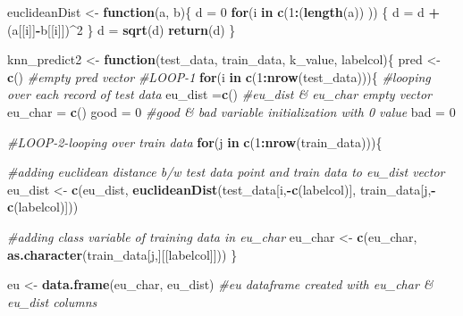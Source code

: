 \documentclass[]{article}
\newenvironment{Shaded}{\begin{snugshade}}{\end{snugshade}}
\newcommand{\KeywordTok}[1]{\textcolor[rgb]{0.13,0.29,0.53}{\textbf{#1}}}
\newcommand{\DecValTok}[1]{\textcolor[rgb]{0.00,0.00,0.81}{#1}}
\newcommand{\StringTok}[1]{\textcolor[rgb]{0.31,0.60,0.02}{#1}}
\newcommand{\CommentTok}[1]{\textcolor[rgb]{0.56,0.35,0.01}{\textit{#1}}}
\newcommand{\ControlFlowTok}[1]{\textcolor[rgb]{0.13,0.29,0.53}{\textbf{#1}}}
\newcommand{\OperatorTok}[1]{\textcolor[rgb]{0.81,0.36,0.00}{\textbf{#1}}}
\newcommand{\NormalTok}[1]{#1}
\begin{document}
\begin{Shaded}
\begin{Highlighting}[]
\NormalTok{euclideanDist <-}\StringTok{ }\ControlFlowTok{function}\NormalTok{(a, b)\{}
\NormalTok{  d =}\StringTok{ }\DecValTok{0}
  \ControlFlowTok{for}\NormalTok{(i }\ControlFlowTok{in} \KeywordTok{c}\NormalTok{(}\DecValTok{1}\OperatorTok{:}\NormalTok{(}\KeywordTok{length}\NormalTok{(a)) ))}
\NormalTok{  \{}
\NormalTok{    d =}\StringTok{ }\NormalTok{d }\OperatorTok{+}\StringTok{ }\NormalTok{(a[[i]]}\OperatorTok{-}\NormalTok{b[[i]])}\OperatorTok{^}\DecValTok{2}
\NormalTok{  \}}
\NormalTok{  d =}\StringTok{ }\KeywordTok{sqrt}\NormalTok{(d)}
  \KeywordTok{return}\NormalTok{(d)}
\NormalTok{\}}

\NormalTok{knn_predict2 <-}\StringTok{ }\ControlFlowTok{function}\NormalTok{(test_data, train_data, k_value, labelcol)\{}
\NormalTok{  pred <-}\StringTok{ }\KeywordTok{c}\NormalTok{()  }\CommentTok{#empty pred vector }
  \CommentTok{#LOOP-1}
  \ControlFlowTok{for}\NormalTok{(i }\ControlFlowTok{in} \KeywordTok{c}\NormalTok{(}\DecValTok{1}\OperatorTok{:}\KeywordTok{nrow}\NormalTok{(test_data)))\{   }\CommentTok{#looping over each record of test data}
\NormalTok{    eu_dist =}\KeywordTok{c}\NormalTok{()          }\CommentTok{#eu_dist & eu_char empty  vector}
\NormalTok{    eu_char =}\StringTok{ }\KeywordTok{c}\NormalTok{()}
\NormalTok{    good =}\StringTok{ }\DecValTok{0}              \CommentTok{#good & bad variable initialization with 0 value}
\NormalTok{    bad =}\StringTok{ }\DecValTok{0}
    
    \CommentTok{#LOOP-2-looping over train data }
    \ControlFlowTok{for}\NormalTok{(j }\ControlFlowTok{in} \KeywordTok{c}\NormalTok{(}\DecValTok{1}\OperatorTok{:}\KeywordTok{nrow}\NormalTok{(train_data)))\{}
 
      \CommentTok{#adding euclidean distance b/w test data point and train data to eu_dist vector}
\NormalTok{      eu_dist <-}\StringTok{ }\KeywordTok{c}\NormalTok{(eu_dist, }\KeywordTok{euclideanDist}\NormalTok{(test_data[i,}\OperatorTok{-}\KeywordTok{c}\NormalTok{(labelcol)], train_data[j,}\OperatorTok{-}\KeywordTok{c}\NormalTok{(labelcol)]))}
 
      \CommentTok{#adding class variable of training data in eu_char}
\NormalTok{      eu_char <-}\StringTok{ }\KeywordTok{c}\NormalTok{(eu_char, }\KeywordTok{as.character}\NormalTok{(train_data[j,][[labelcol]]))}
\NormalTok{    \}}
    
\NormalTok{    eu <-}\StringTok{ }\KeywordTok{data.frame}\NormalTok{(eu_char, eu_dist) }\CommentTok{#eu dataframe created with eu_char & eu_dist columns}
 

\end{Highlighting}
\end{Shaded}
\end{document}
